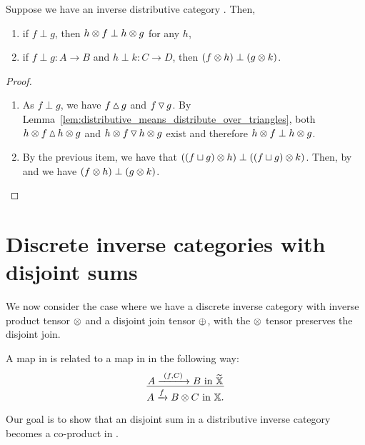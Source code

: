 \begin{corollary}\label{cor:inverse_product_and_disjointness}
  Suppose we have an inverse distributive category \X. Then,
  \begin{enumerate}[{(}i{)}]
    \item if $f \perp g$, then $h\otimes f \perp h\otimes  g$ for any $h$,
    \item  if  $f\perp g : A\to B$ and $h \perp k: C\to D$, then $(f\otimes h)\perp (g\otimes k)$.
   \end{enumerate}
\end{corollary}
\begin{proof}
  \prepprooflist
  \begin{enumerate}[{(}i{)}]
    \item As $f\perp g$, we have $f\operatorname{\vartriangle} g$ and $f\operatorname{\triangledown} g$. By
      Lemma~\ref{lem:distributive_means_distribute_over_triangles}, both $h\otimes f \operatorname{\vartriangle} h\otimes g$ and
      $h\otimes f \operatorname{\triangledown} h\otimes g$ exist and therefore $h\otimes f \perp h\otimes g$.
    \item By the previous item, we have that $((f\sqcup g)\otimes h) \perp ((f\sqcup g)\otimes k)$. Then, by
       and  we have $(f\otimes h)\perp (g\otimes k)$.
  \end{enumerate}
\end{proof}

\section{Discrete inverse categories with disjoint sums} %
\label{sec:discrete_inverse_categories_with_disjoint_sums}

We now consider the case where we have a discrete inverse category with inverse product
tensor $\otimes$ and a disjoint join tensor $\oplus$, with the $\otimes$ tensor preserves the
disjoint join.

A map in \Xt is related to a map in \X in the following way:
\[
  \infer{A\xrightarrow{f} B\*C \text{ in }\X.}{A \xrightarrow{\ (f,C)\ } B \text{ in } \Xt}
\]

Our goal is to show that an disjoint sum in a distributive inverse category becomes a co-product
in \Xt.

